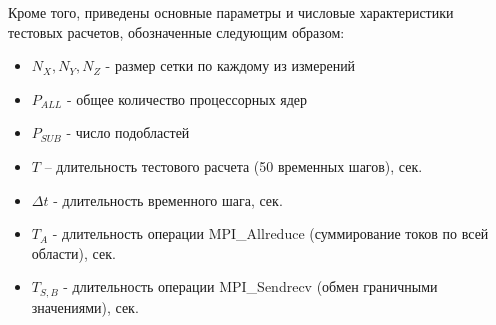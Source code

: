 Кроме того, приведены основные параметры и числовые характеристики тестовых расчетов, обозначенные следующим образом:
\begin{itemize}
	\item $N_X, N_Y, N_Z$  - размер сетки по каждому из измерений
	\item $P_{ALL}$  - общее количество процессорных ядер
	\item $P_{SUB}$  - число подобластей
	\item $T$ – длительность тестового расчета (50 временных шагов), сек.
	\item $\Delta t$  - длительность временного шага, сек.
	\item $T_{A}$ - длительность операции MPI\_Allreduce (суммирование токов по всей области), сек.
	\item $T_{S,B}$ - длительность операции MPI\_Sendrecv (обмен граничными значениями), сек.
\end{itemize}


